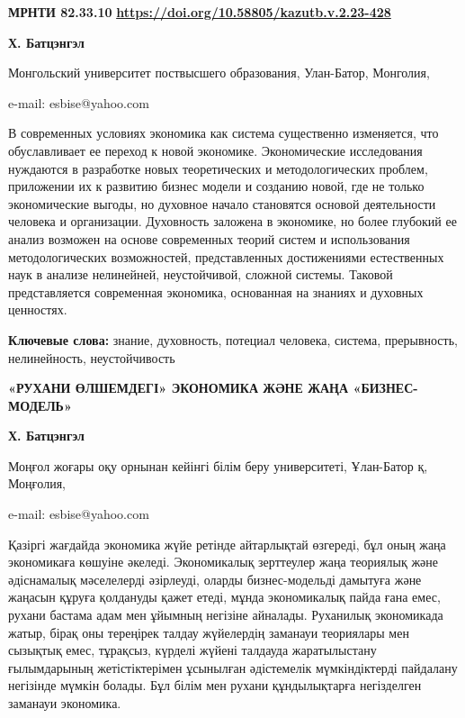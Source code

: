 \newpage
{}
{\bfseries МРНТИ 82.33.10}
\hfill {\bfseries \href{https://doi.org/10.58805/kazutb.v.2.23-428}{https://doi.org/10.58805/kazutb.v.2.23-428}}


\begin{center}
{\bfseries Х. Батцэнгэл}

Монгольский университет поствысшего образования, Улан-Батор, Монголия,

e-mail: esbise@yahoo.com
\end{center}

В современных условиях экономика как система существенно изменяется, что
обуславливает ее переход к новой экономике. Экономические исследования
нуждаются в разработке новых теоретических и методологических проблем,
приложении их к развитию бизнес модели и созданию новой, где не только
экономические выгоды, но духовное начало становятся основой деятельности
человека и организации. Духовность заложена в экономике, но более
глубокий ее анализ возможен на основе современных теорий систем и
использования методологических возможностей, представленных достижениями
естественных наук в анализе нелинейней, неустойчивой, сложной системы.
Таковой представляется современная экономика, основанная на знаниях и
духовных ценностях.

{\bfseries Ключевые слова:} знание, духовность, потециал человека, система,
прерывность, нелинейность, неустойчивость

\begin{center}
{\large\bfseries «РУХАНИ ӨЛШЕМДЕГІ» ЭКОНОМИКА ЖӘНЕ ЖАҢА «БИЗНЕС-МОДЕЛЬ»}

{\bfseries Х. Батцэнгэл}

Моңғол жоғары оқу орнынан кейінгі білім беру университеті, Ұлан-Батор қ,
Моңғолия,

e-mail: esbise@yahoo.com
\end{center}

Қазіргі жағдайда экономика жүйе ретінде айтарлықтай өзгереді, бұл оның
жаңа экономикаға көшуіне әкеледі. Экономикалық зерттеулер жаңа теориялық
және әдіснамалық мәселелерді әзірлеуді, оларды бизнес-модельді дамытуға
және жаңасын құруға қолдануды қажет етеді, мұнда экономикалық пайда ғана
емес, рухани бастама адам мен ұйымның негізіне айналады. Руханилық
экономикада жатыр, бірақ оны тереңірек талдау жүйелердің заманауи
теориялары мен сызықтық емес, тұрақсыз, күрделі жүйені талдауда
жаратылыстану ғылымдарының жетістіктерімен ұсынылған әдістемелік
мүмкіндіктерді пайдалану негізінде мүмкін болады. Бұл білім мен рухани
құндылықтарға негізделген заманауи экономика.

